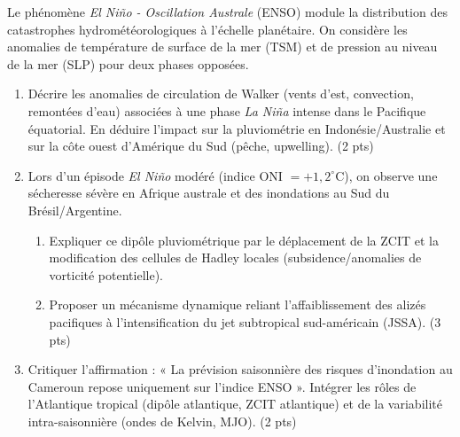 \documentclass[11pt]{article}
\begin{document}
\begin{exercice}
Le phénomène \textit{El Niño - Oscillation Australe} (ENSO) module la distribution des catastrophes hydrométéorologiques à l'échelle planétaire. On considère les anomalies de température de surface de la mer (TSM) et de pression au niveau de la mer (SLP) pour deux phases opposées.

\begin{enumerate}
\item Décrire les anomalies de circulation de Walker (vents d'est, convection, remontées d'eau) associées à une phase \textit{La Niña} intense dans le Pacifique équatorial. En déduire l'impact sur la pluviométrie en Indonésie/Australie et sur la côte ouest d'Amérique du Sud (pêche, upwelling). (2 pts)
\item Lors d'un épisode \textit{El Niño} modéré (indice ONI $= +1,2^\circ$C), on observe une sécheresse sévère en Afrique australe et des inondations au Sud du Brésil/Argentine. 
\begin{enumerate}
\item Expliquer ce dipôle pluviométrique par le déplacement de la ZCIT et la modification des cellules de Hadley locales (subsidence/anomalies de vorticité potentielle). 
\item Proposer un mécanisme dynamique reliant l'affaiblissement des alizés pacifiques à l'intensification du jet subtropical sud-américain (JSSA). (3 pts)
\end{enumerate}
\item Critiquer l'affirmation : « La prévision saisonnière des risques d'inondation au Cameroun repose uniquement sur l'indice ENSO ». Intégrer les rôles de l'Atlantique tropical (dipôle atlantique, ZCIT atlantique) et de la variabilité intra-saisonnière (ondes de Kelvin, MJO). (2 pts)
\end{enumerate}
\end{exercice}
\end{document}
